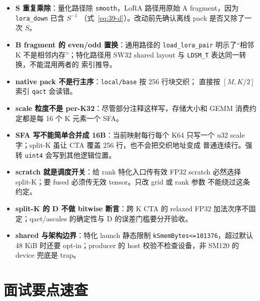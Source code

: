 \begin{itemize}[itemsep=1pt,topsep=2pt]
  \item \textbf{S 重复乘除}：量化路径除 \texttt{smooth}，LoRA 路径用原始
        A fragment，因为 \texttt{lora\_down} 已含 $S^{-1}$
        （式~\ref{eq:39-d}）。改动前先确认离线 pack 是否又除了一次 $S$。
  \item \textbf{B fragment 的 even/odd 置换}：通用路径的
        \texttt{load\_lora\_pair} 明示了“相邻 K 不是相邻内存”；特化路径用
        SW32 shared layout 与 \texttt{LDSM\_T} 表达同一转换，不能混用两者的
        索引推导。
  \item \textbf{native pack 不是行主序}：\texttt{local/base} 按 256 行块交织；
        直接按 $[M,K/2]$ 索引 \texttt{qact} 会读错。
  \item \textbf{scale 粒度不是 per-K32}：尽管部分注释这样写，存储大小和 GEMM
        消费约定都是每 16 个 K 元素一个 SFA。
  \item \textbf{SFA 写不能简单合并成 16B}：当前映射每行每个 K64 只写一个
        u32 scale 字；split-K 虽让 CTA 覆盖 256 行，也不会把交织地址变成
        普通连续行。强转 \texttt{uint4} 会写到其他逻辑位置。
  \item \textbf{scratch 就是调度开关}：给 rank 特化入口传有效 FP32 scratch
        必然选择 split-K；要 fused 必须传无效 tensor。只改 grid 或 rank 参数
        不能绕过这条约定。
  \item \textbf{split-K 的 D 不做 bitwise 断言}：跨 K CTA 的 relaxed FP32
        加法次序不固定；qact/ascales 的确定性与 D 的误差门槛要分开验收。
  \item \textbf{shared 与架构边界}：特化 launch 静态限制
        \texttt{kSmemBytes<=101376}，超过默认 48 KiB 时还要 opt-in；producer
        的 host 校验不检查设备，非 SM120 的 device 兜底是 trap。
\end{itemize}

\section{面试要点速查}

